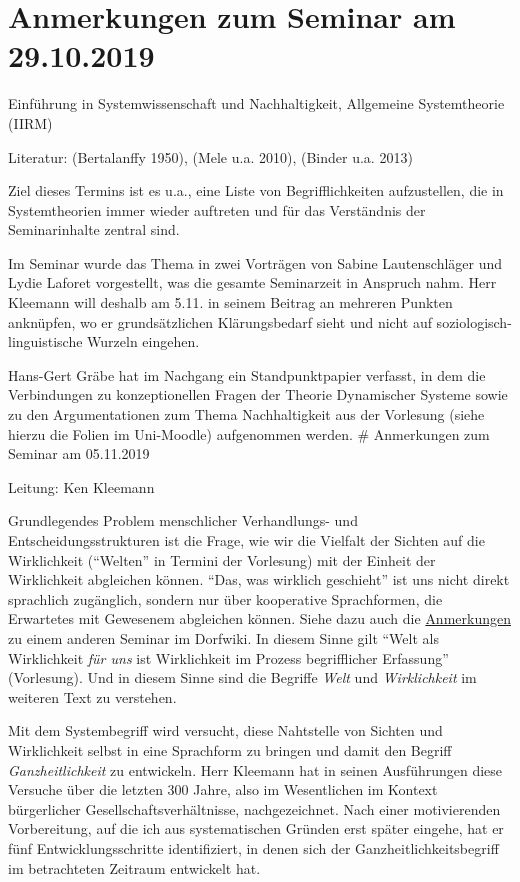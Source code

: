 \documentclass[11pt,a4paper]{article}
\begin{document}
\hypertarget{anmerkungen-zum-seminar-am-29.10.2019}{%
\section{Anmerkungen zum Seminar am
29.10.2019}\label{anmerkungen-zum-seminar-am-29.10.2019}}

Einführung in Systemwissenschaft und Nachhaltigkeit, Allgemeine
Systemtheorie (IIRM)

Literatur: (Bertalanffy 1950), (Mele u.a. 2010), (Binder u.a. 2013)

Ziel dieses Termins ist es u.a., eine Liste von Begrifflichkeiten
aufzustellen, die in Systemtheorien immer wieder auftreten und für das
Verständnis der Seminarinhalte zentral sind.

Im Seminar wurde das Thema in zwei Vorträgen von Sabine Lautenschläger
und Lydie Laforet vorgestellt, was die gesamte Seminarzeit in Anspruch
nahm. Herr Kleemann will deshalb am 5.11. in seinem Beitrag an mehreren
Punkten anknüpfen, wo er grundsätzlichen Klärungsbedarf sieht und nicht
auf soziologisch-linguistische Wurzeln eingehen.

Hans-Gert Gräbe hat im Nachgang ein Standpunktpapier verfasst, in dem
die Verbindungen zu konzeptionellen Fragen der Theorie Dynamischer
Systeme sowie zu den Argumentationen zum Thema Nachhaltigkeit aus der
Vorlesung (siehe hierzu die Folien im Uni-Moodle) aufgenommen werden. \#
Anmerkungen zum Seminar am 05.11.2019

Leitung: Ken Kleemann

Grundlegendes Problem menschlicher Verhandlungs- und
Entscheidungsstrukturen ist die Frage, wie wir die Vielfalt der Sichten
auf die Wirklichkeit (``Welten'' in Termini der Vorlesung) mit der
Einheit der Wirklichkeit abgleichen können. ``Das, was wirklich
geschieht'' ist uns nicht direkt sprachlich zugänglich, sondern nur über
kooperative Sprachformen, die Erwartetes mit Gewesenem abgleichen
können. Siehe dazu auch die
\href{http://www.dorfwiki.org/wiki.cgi?HansGertGraebe/SeminarWissen/2019-10-24}{Anmerkungen}
zu einem anderen Seminar im Dorfwiki. In diesem Sinne gilt ``Welt als
Wirklichkeit \emph{für uns} ist Wirklichkeit im Prozess begrifflicher
Erfassung'' (Vorlesung). Und in diesem Sinne sind die Begriffe
\emph{Welt} und \emph{Wirklichkeit} im weiteren Text zu verstehen.

Mit dem Systembegriff wird versucht, diese Nahtstelle von Sichten und
Wirklichkeit selbst in eine Sprachform zu bringen und damit den Begriff
\emph{Ganzheitlichkeit} zu entwickeln. Herr Kleemann hat in seinen
Ausführungen diese Versuche über die letzten 300 Jahre, also im
Wesentlichen im Kontext bürgerlicher Gesellschaftsverhältnisse,
nachgezeichnet. Nach einer motivierenden Vorbereitung, auf die ich aus
systematischen Gründen erst später eingehe, hat er fünf
Entwicklungsschritte identifiziert, in denen sich der
Ganzheitlichkeitsbegriff im betrachteten Zeitraum entwickelt hat.
\end{document}
